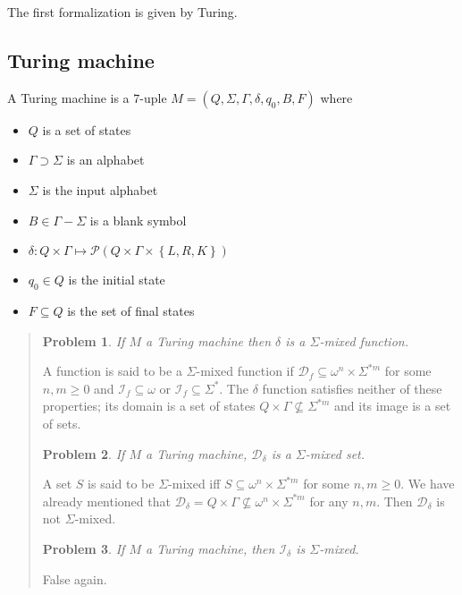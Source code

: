 \documentclass[a4paper, 12pt]{article}
\newtheorem{problem}{Problem}
\newtheorem{problem}{Problem}
\begin{document}
The first formalization is given by Turing.

\subsection{Turing machine}

A Turing machine is a $7$-uple $M = \left( Q, \Sigma, \Gamma, \delta, q_0, B, F
\right) $ where

\begin{itemize}
    \item $Q$ is a set of states 
    \item $\Gamma \supset \Sigma$ is an alphabet
    \item $\Sigma$ is the input alphabet
    \item $B \in \Gamma - \Sigma$ is a blank symbol 
    \item $\delta : Q \times \Gamma \mapsto \mathcal{P} \left( Q \times \Gamma \times \left\{
        L, R, K\right\}  \right) $ 
    \item $q_0 \in Q$ is the initial state 
    \item $F \subseteq Q$ is the set of final states
\end{itemize}


\small
\begin{quote}

\begin{problem}
    If $M$ a Turing machine then $\delta$ is a $\Sigma$-mixed function.
\end{problem}

A function is said to be a $\Sigma$-mixed function if $\mathcal{D}_f \subseteq
\omega^n \times \Sigma^{*m}$ for some $n, m \geq 0$ and $\mathcal{I}_f \subseteq
\omega$ or $\mathcal{I}_f \subseteq \Sigma^{*}$. The $\delta$ function satisfies
neither of these properties; its domain is a set of states $Q \times \Gamma \not\subseteq
\Sigma^{*m}$ and its image is a set of sets.

\begin{problem}
    If $M$ a Turing machine, $\mathcal{D}_{\delta}$ is a $\Sigma$-mixed set.
\end{problem}

A set $S$ is said to be $\Sigma$-mixed iff $S \subseteq \omega^n \times
\Sigma^{*m}$ for some $n, m \geq 0$. We have already mentioned that
$\mathcal{D}_\delta = Q \times \Gamma \not\subseteq \omega^n \times \Sigma^{*m}$ for any $n,
m$. Then $\mathcal{D}_\delta$ is not $\Sigma$-mixed.

\begin{problem}
    If $M$ a Turing machine, then $\mathcal{I}_{\delta}$ is $\Sigma$-mixed.
\end{problem}

False again.

\end{quote}
\normalsize
\end{document}
